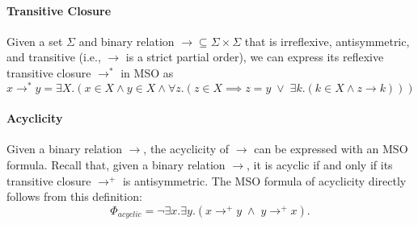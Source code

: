 
\paragraph*{Transitive Closure}

Given a set $\Sigma$ and binary relation $\to \subseteq \Sigma \times \Sigma$ that is irreflexive, antisymmetric, and transitive (i.e., $\to$ is a strict partial order), we can express its reflexive transitive closure $\to^*$ in MSO as
\[
x \to^* y = \exists X.(x \in X \wedge y \in X \wedge 
\forall z.(z \in X \implies z=y \;\vee\; 
\exists k.(k \in X \wedge z \to k)))
\]

\paragraph*{Acyclicity} 

Given a binary relation $\to$, the acyclicity of $\to$ can be expressed with an MSO formula. Recall that, given a binary relation $\to$, it is acyclic if and only if its transitive closure $\to^+$ is antisymmetric. The MSO formula of acyclicity directly follows from this definition:
\[
\Phi_{acyclic} =  \neg \exists x.\exists y.(x \to^+ y \;\wedge\; y \to^+ x).   
\]
